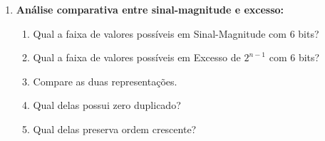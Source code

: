 \begin{enumerate}
    \item \textbf{Análise comparativa entre sinal-magnitude e excesso:}
          \begin{enumerate}
              \item Qual a faixa de valores possíveis em Sinal-Magnitude com 6 bits?
              \item Qual a faixa  de valores possíveis em Excesso de $2^{n-1}$ com 6 bits?
              \item Compare as duas representações.
              \item Qual delas possui zero duplicado?
              \item Qual delas preserva ordem crescente?
          \end{enumerate}



\end{enumerate}